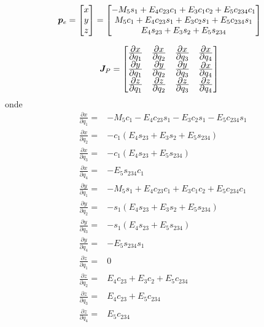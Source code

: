 \begin{equation}
\bm{p}_e = \begin{bmatrix}x \\ y \\ z\end{bmatrix} =
\begin{bmatrix}
   -M_5 s_1 + E_4 c_{23}c_1 + E_3 c_1 c_2 + E_5 c_{234} c_1 \\
     M_5 c_1+E_4 c_{23} s_1 + E_3 c_2 s_1 + E_5 c_{234} s_1 \\
   						 E_4 s_{23} + E_3 s_2 + E_5 s_{234} \\
\end{bmatrix}
\end{equation}

\begin{equation}
\bm{J}_P = 
\begin{bmatrix}
	\frac{\displaystyle \partial x}{\displaystyle \partial q_1} & \frac{\displaystyle \partial x}{\displaystyle \partial q_2} & \frac{\displaystyle \partial x}{\displaystyle \partial q_3} & \frac{\displaystyle \partial x}{\displaystyle \partial q_4}  \\
	\frac{\displaystyle \partial y}{\displaystyle \partial q_1} & \frac{\displaystyle \partial y}{\displaystyle \partial q_2} & \frac{\displaystyle \partial y}{\displaystyle \partial q_3} & \frac{\displaystyle \partial x}{\displaystyle \partial q_4}  \\
	\frac{\displaystyle \partial z}{\displaystyle \partial q_1} & \frac{\displaystyle \partial z}{\displaystyle \partial q_2} & \frac{\displaystyle \partial z}{\displaystyle \partial q_3} & \frac{\displaystyle \partial z}{\displaystyle \partial q_4}  \\
\end{bmatrix}
\end{equation}
onde
\begin{align*}
&\frac{\partial x}{\partial q_1} =& - M_5c_1 - E_4c_{23}s_1 - E_3c_2s_1 - E_5c_{234}s_1  \\
&\frac{\partial x}{\partial q_2} =& -c_1(E_4s_{23}+E_3s_2+E_5s_{234}) \\
&\frac{\partial x}{\partial q_3} =& -c_1(E_4s_{23}+E_5s_{234}) \\
&\frac{\partial x}{\partial q_4} =& -E_5s_{234}c_1 \\
&\frac{\partial y}{\partial q_1} =& -M_5s_1+E_4c_{23}c_1+E_3c_1c_2+E_5c_{234}c_1 \\
&\frac{\partial y}{\partial q_2} =& -s_1(E_4s_{23}+E_3s_2+E_5s_{234}) \\
&\frac{\partial y}{\partial q_3} =& -s_1(E_4s_{23}+E_5s_{234}) \\
&\frac{\partial y}{\partial q_4} =& -E_5s_{234}s_1 \\ 
&\frac{\partial z}{\partial q_1} =& 0 \\ 
&\frac{\partial z}{\partial q_2} =& E_4c_{23}+E_3c_2+E_5c_{234} \\
&\frac{\partial z}{\partial q_3} =& E_4c_{23}+E_5c_{234}\\
&\frac{\partial z}{\partial q_4} =& E_{5}c_{234} 
\end{align*}

